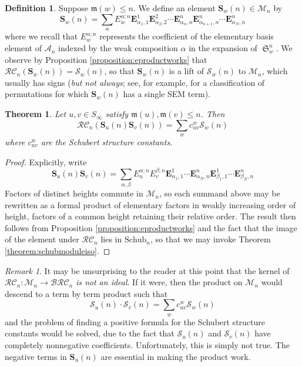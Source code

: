 \documentclass{amsart}
\newtheorem{theorem}{Theorem}[section]
\theoremstyle{definition}
\newtheorem{definition}[lemma]{Definition}
\theoremstyle{remark}
\newtheorem*{remark}{Remark}
\numberwithin{equation}{subsection}
\DeclareMathOperator{\sch}{\mathfrak{S}}
\newcommand{\BRC}{\mathcal{BRC}}
\newcommand{\RC}{\mathcal{RC}}
\newcommand{\coma}{\mathcal{A}}
\newcommand{\maxd}{\mathfrak{m}}
\begin{document}
\begin{definition}
  Suppose $\maxd(w)\leq n$. We define an element $\mathbf{S}_w(n)\in \mathcal{M}_n$ by
  $$\mathbf{S}_w(n) = \sum_{\alpha} E_w^{\alpha;n}\mathbf{E}_{\alpha_1,1}^1 \mathbf{E}_{\alpha_2,2}^2 \cdots  \mathbf{E}_{\alpha_n,n}^n\mathbf{E}_{\alpha_{n+1}, n}^n\cdots \mathbf{E}_{\alpha_N,n}^n$$
  where we recall that $E_w^{\alpha;n}$ represents the coefficient of the elementary basis element of $\coma_n$ indexed by the weak composition $\alpha$ in the expansion of $\sch_w^n$. We observe by Proposition \ref{proposition:eproductworks} that $\RC_n(\mathbf{S}_w(n)) = \mathcal{S}_w(n)$, so that $\mathbf{S}_w(n)$ is a lift of $\mathcal{S}_w(n)$ to $\mathcal{M}_n$, which usually has signs (\emph{but not always}; see, for example, \cite{woodruff2025single} for a classification of permutations for which $\mathbf{S}_w(n)$ has a single SEM term).
\end{definition}

\begin{theorem} \label{theorem:schubproduct}
Let $u,v\in S_\infty$ satisfy $\maxd(u),\maxd(v)\leq n$. Then
$$\RC_n(\mathbf{S}_u(n)\mathbf{S}_v(n)) = \sum_{w} c_{uv}^w \mathcal{S}_w(n)$$
where $c_{uv}^w$ are the Schubert structure constants.
\end{theorem}
\begin{proof}
  Explicitly, write
  $$\mathbf{S}_u(n)\mathbf{S}_v(n) = \sum_{\alpha,\beta} E_u^{\alpha;n}E_v^{\beta;n} \mathbf{E}_{\alpha_1,1}^1 \cdots  \mathbf{E}_{\alpha_N,n}^n \mathbf{E}_{\beta_1,1}^1 \cdots  \mathbf{E}_{\beta_N,n}^n$$
  Factors of distinct heights commute in $\mathcal{M}_n$, so each summand above may be rewritten as a formal product of elementary factors in weakly increasing order of height, factors of a common height retaining their relative order. The result then follows from Proposition \ref{proposition:eproductworks} and the fact that the image of the element under $\RC_n$ lies in $\mathrm{Schub}_n$, so that we may invoke Theorem \ref{theorem:schubmoduleiso}.
\end{proof}

\begin{remark}
It may be unsurprising to the reader at this point that the kernel of $\RC_n:\mathcal{M}_n\to \BRC_n$ \emph{is not an ideal}. If it were, then the product on $\mathcal{M}_n$ would descend to a term by term product such that
$$\mathcal{S}_u(n)\cdot \mathcal{S}_v(n) = \sum_{w} c_{uv}^w \mathcal{S}_w(n)$$
and the problem of finding a positive formula for the Schubert structure constants would be solved, due to the fact that $\mathcal{S}_u(n)$ and $\mathcal{S}_v(n)$ have completely nonnegative coefficients. Unfortunately, this is simply not true. The negative terms in $\mathbf{S}_u(n)$ are essential in making the product work.
\end{remark}
\end{document}
